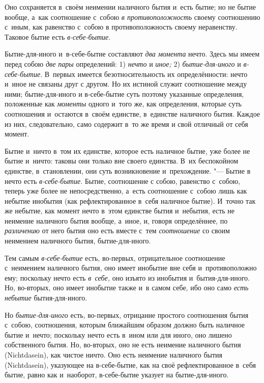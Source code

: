Оно сохраняется в~своём неимении наличного бытия и~есть бытие; но не бытие
вообще, а~как соотношение с~собою {\em в
противоположность} своему соотношению с~иным, как равенство с~собою в
противоположность своему неравенству. Таковое бытие есть
{\em в-себе-бытие}.

Бытие-для-иного и~в-себе-бытие составляют {\em два момента} нечто. Здесь
мы имеем перед собою {\em две пары} определений: 1) {\em нечто} и
{\em иное;} 2) {\em бытие-для-иного} и {\em в-себе-бытие}. В~первых имеется
безотносительность их определённости: нечто и~иное не связаны друг с
другом. Но их истиной служит соотношение между ними; бытие-для-иного и
в-себе-бытие суть поэтому указанные определения, положенные как
{\em моменты} одного и~того же, как определения,
которые суть соотношения и~остаются в~своём единстве, в~единстве наличного
бытия. Каждое из них, следовательно, само содержит в~то же время
и свой отличный от себя момент.

Бытие и~ничто в~том их единстве, которое есть наличное бытие, уже более не
бытие и~ничто: таковы они только вне своего единства. В~их беспокойном
единстве, в~становлении, они суть возникновение и~прехождение. "--- Бытие в
нечто есть {\em в-себе-бытие}. Бытие, соотношение с
собою, равенство с~собою, теперь уже более не непосредственно, а~есть
соотношение с~собою лишь как небытие инобытия (как рефлектированное в~себя
наличное бытие). И~точно так же небытие, как момент нечто в~этом единстве
бытия и~небытия, есть не неимение наличного бытия вообще, а~иное, и,
говоря определённее, по {\em различению} от него бытия
оно есть вместе с~тем {\em соотношение} со своим
неимением наличного бытия, бытие-для-иного.

Тем самым {\em в-себе-бытие} есть, во-первых,
отрицательное соотношение с~неимением наличного бытия, оно имеет инобытие
вне себя и~противоположно ему; поскольку нечто есть
{\em в~себе,} оно изъято из инобытия и~бытия-для-иного.
Но, во-вторых, оно имеет инобытие также и~в самом себе, ибо оно
само {\em есть небытие} бытия-для-иного.

Но {\em бытие-для-иного} есть, во-первых, отрицание
простого соотношения бытия с~собою, соотношения, которым ближайшим образом
должно быть наличное бытие и~нечто; поскольку нечто есть в~ином
или для иного, оно лишено собственного бытия. Но, во-вторых,
оно не есть неимение наличного бытия (Nicht\-dasein), как чистое ничто. Оно
есть неимение наличного бытия (Nicht\-dasein), указующее на в-себе-бытие, как
на своё рефлектированное в~себя бытие, равно как и~наоборот, в-себе-бытие
указует на бытие-для-иного.

